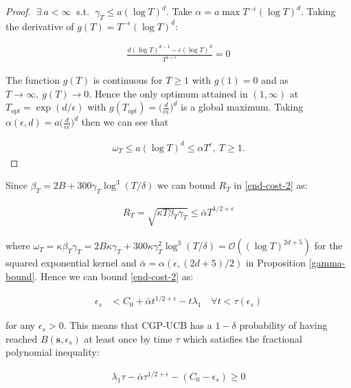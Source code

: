 \documentclass[10pt,a4paper]{article}
\newcommand{\traj}{\mathbf{s}} %
\begin{document}
\begin{proof}
$\ \exists \ a < \infty \ $ s.t. $\ \gamma_{T} \leq a (\log T)^{d}$. Take $\alpha = a \max T^{-\epsilon} (\log T)^{d}$. Taking the derivative of $g(T) = T^{-\epsilon} (\log T)^{d}$:

\begin{align}
\frac{d(\log T)^{d-1} - \epsilon(\log T)^{d}}{T^{1+\epsilon}} = 0
\end{align}

The function $g(T)$ is continuous for $T \geq 1$ with $g(1) = 0$ and as $T \to \infty, \ g(T) \to 0$. Hence the only optimum attained in $(1, \infty)$ at $T_{opt} = \exp(d/\epsilon)$ with $g(T_{opt}) = \big(\frac{d}{e\epsilon}\big)^{d}$ is a global maximum. Taking $\alpha(\epsilon,d) = a\big(\frac{d}{e\epsilon}\big)^{d}$ then we can see that 

\begin{align}
\omega_{T} \leq a (\log T)^{d} \leq \alpha T^{\epsilon}, \ T \geq 1. 
\end{align}

\end{proof}

Since $\beta_T = 2B + 300\gamma_{T}\log^{3}(T/\delta)$ we can bound $R_T$ in \eqref{end-cost-2} as:

\begin{align}
R_T = \sqrt{\kappa T \beta_{T} \gamma_{T}} \leq \bar{\alpha}T^{1/2 + \epsilon} 
\end{align}

where $\omega_T = \kappa\beta_T\gamma_T = 2B\kappa\gamma_T + 300\kappa\gamma_T^2\log^{3}(T/\delta) = \mathcal{O}((\log T)^{2d+5})$ for the squared exponential kernel and $\bar{\alpha} = \alpha(\epsilon,(2d+5)/2)$ in Proposition \ref{gamma-bound}. Hence we can bound \eqref{end-cost-2} as:

\begin{align}
\epsilon_{s} &<  C_{0} + \bar{\alpha} t^{1/2 + \epsilon} - t\lambda_1 \quad \forall t < \tau(\epsilon_s) \label{end-cost-3}
\end{align}

for any $\epsilon_s > 0$. This means that CGP-UCB has a $1-\delta$ probability of having reached $B(\traj,\epsilon_s)$ at least once by time $\tau$ which satisfies the fractional polynomial inequality:

\begin{align}
\lambda_1 \tau - \bar{\alpha} \tau^{1/2 + \epsilon} - (C_{0}-\epsilon_s) \geq 0 \label{frac-poly-ineq}
\end{align}
\end{document}
